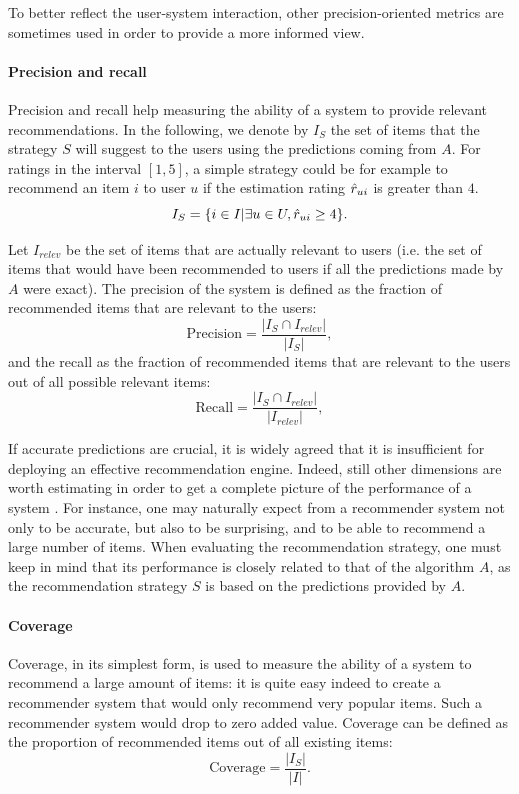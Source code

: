 To better reflect the user-system interaction, other precision-oriented metrics
are sometimes used in order to provide a more informed view.

\paragraph{Precision and recall\\}
Precision and recall help measuring the ability of a system to provide
relevant recommendations.
In the following, we denote by $I_{S}$ the set of items that the strategy
$S$ will suggest to the users using the predictions coming from $A$. For
ratings in the interval $[1, 5]$, a simple strategy could be for example to
recommend an item $i$ to user $u$ if the estimation rating $\hat{r}_{ui}$ is
greater than $4$.  $$I_S = \{i \in I | \exists u \in U, \hat{r}_{ui} \geq
4\}.$$

Let $I_{relev}$ be the set of items that are actually relevant to users (i.e.
the set of items that would have been recommended to users if all the
predictions made by $A$ were exact).
The precision of the system is defined as the fraction of recommended items that
are relevant to the users:
$$\text{Precision} = \frac{|I_{S} \cap I_{relev}|}{|I_{S}|},$$
and the recall as the fraction of recommended items that are relevant to the
users out of all possible relevant items:
$$\text{Recall} = \frac{|I_{S} \cap I_{relev}|}{|I_{relev}|},$$

If accurate predictions are crucial, it is widely agreed that it is
insufficient for deploying an effective recommendation engine. Indeed, still
other dimensions are worth estimating in order to get a complete picture of the
performance of a system
\cite{NeeRieKonACM2006,HerKonJohTerRieACM2004,KamBriRecSys2014}.
For instance, one may naturally expect from a recommender system
not only to be accurate, but also to be surprising, and to be able to recommend
a large number of items. When evaluating the recommendation strategy, one must
keep in mind that its performance is closely related to that of the algorithm
$A$, as the recommendation strategy $S$ is based on the predictions provided by
$A$.


\paragraph{Coverage\\}
Coverage, in its simplest form, is used to measure the ability of a system to
recommend a large amount of items: it is quite easy indeed to create a
recommender system that would only recommend very popular items. Such a
recommender system would drop to zero added value. Coverage can be defined as the
proportion of recommended items out of all existing items:
$$\text{Coverage} = \frac{|I_{S}|}{|I|}.$$



